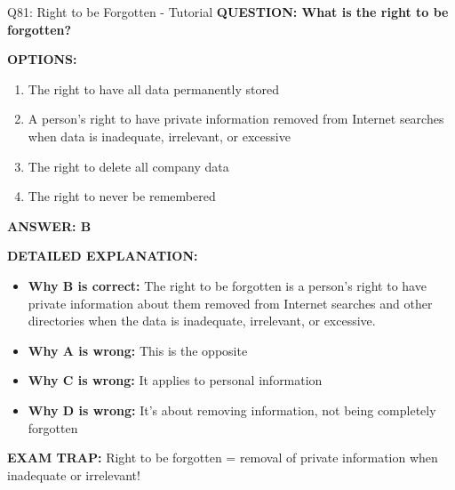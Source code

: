 \documentclass[8pt]{beamer}
\begin{document}
	\begin{frame}{Q81: Right to be Forgotten - Tutorial}
		\fontsize{6.5}{7.5}\selectfont
		\textbf{QUESTION: What is the right to be forgotten?}
		
		\vspace{0.1cm}
		\textbf{OPTIONS:}
		\begin{enumerate}
			\item The right to have all data permanently stored
			\item A person's right to have private information removed from Internet searches when data is inadequate, irrelevant, or excessive
			\item The right to delete all company data
			\item The right to never be remembered
		\end{enumerate}
		
		\vspace{0.1cm}
		\textcolor{myblue}{\textbf{ANSWER: B}}
		
		\vspace{0.1cm}
		\textbf{DETAILED EXPLANATION:}
		\begin{itemize}
			\item \textbf{Why B is correct:} The right to be forgotten is a person's right to have private information about them removed from Internet searches and other directories when the data is inadequate, irrelevant, or excessive.
			\item \textbf{Why A is wrong:} This is the opposite
			\item \textbf{Why C is wrong:} It applies to personal information
			\item \textbf{Why D is wrong:} It's about removing information, not being completely forgotten
		\end{itemize}
		
		\textcolor{myred}{\textbf{EXAM TRAP:}} Right to be forgotten = \textcolor{myblue}{removal of private information when inadequate or irrelevant}!
	\end{frame}
	
\end{document}
